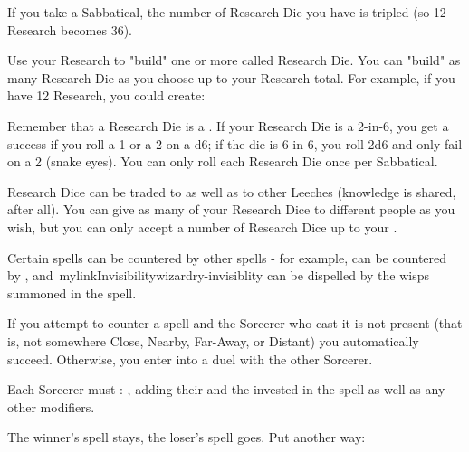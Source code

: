 {If you take a Sabbatical, the number of Research Die you have is tripled (so
12 Research becomes 36).

Use your Research to "build" one or more \KNACK called Research Die. You can
"build" as many Research Die as you choose up to your Research total. For
example, if you have 12 Research, you could create:


Remember that a Research Die is a \KNACK.  If your Research Die is a 2-in-6,
you get a success if you roll a 1 or a 2 on a d6; if the die is 6-in-6, you
roll 2d6 and only fail on a 2 (snake eyes).  You can only roll each Research
Die once per Sabbatical.

Research Dice can be traded to  as well as to
other Leeches (knowledge is shared, after all). You can give as many of your
Research Dice to different people as you wish, but you can only accept a
number of Research Dice up to your .


Certain spells can be countered by other spells - for example,
 can be countered by
, and
\,mylink{Invisibility}{wizardry-invisiblity} can be dispelled by the wisps
summoned in the  spell. 

If you attempt to counter a spell and the Sorcerer who cast it is not
present (that is, not somewhere Close, Nearby, Far-Away, or Distant) you
automatically succeed.  Otherwise, you enter into a duel with the other
Sorcerer.

Each Sorcerer must \RB : \INT, adding their \LVL and the \DICE invested in
the spell as well as any other modifiers.  



The winner's spell stays, the loser's spell goes.  Put another way: 


}
